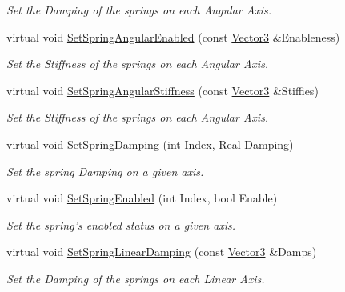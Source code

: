 \begin{DoxyCompactItemize}
\begin{DoxyCompactList}\small\item\em Set the Damping of the springs on each Angular Axis. \item\end{DoxyCompactList}\item 
virtual void \hyperlink{classMezzanine_1_1Generic6DofSpringConstraint_a49a615cb3033d6d29e4c1bd528fe2e5d}{SetSpringAngularEnabled} (const \hyperlink{classMezzanine_1_1Vector3}{Vector3} \&Enableness)
\begin{DoxyCompactList}\small\item\em Set the Stiffness of the springs on each Angular Axis. \item\end{DoxyCompactList}\item 
virtual void \hyperlink{classMezzanine_1_1Generic6DofSpringConstraint_a3340a2f24f934ba2abe86fb69a40240e}{SetSpringAngularStiffness} (const \hyperlink{classMezzanine_1_1Vector3}{Vector3} \&Stiffies)
\begin{DoxyCompactList}\small\item\em Set the Stiffness of the springs on each Angular Axis. \item\end{DoxyCompactList}\item 
virtual void \hyperlink{classMezzanine_1_1Generic6DofSpringConstraint_a230f5aff1e8214ef64fa86c49809597c}{SetSpringDamping} (int Index, \hyperlink{namespaceMezzanine_a726731b1a7df72bf3583e4a97282c6f6}{Real} Damping)
\begin{DoxyCompactList}\small\item\em Set the spring Damping on a given axis. \item\end{DoxyCompactList}\item 
virtual void \hyperlink{classMezzanine_1_1Generic6DofSpringConstraint_afa5c430106ef5cb423f6ffa95ddb1867}{SetSpringEnabled} (int Index, bool Enable)
\begin{DoxyCompactList}\small\item\em Set the spring's enabled status on a given axis. \item\end{DoxyCompactList}\item 
virtual void \hyperlink{classMezzanine_1_1Generic6DofSpringConstraint_a16c7c92d33b39f70d511c051ca63883c}{SetSpringLinearDamping} (const \hyperlink{classMezzanine_1_1Vector3}{Vector3} \&Damps)
\begin{DoxyCompactList}\small\item\em Set the Damping of the springs on each Linear Axis. \item\end{DoxyCompactList}\item 

\end{DoxyCompactItemize}
